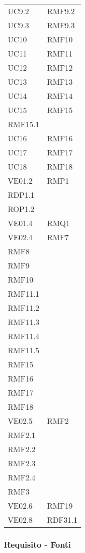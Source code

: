 \begin{longtable}[h!] { >{\centering}m{5cm} >{\centering}m{5cm} }
	 \tabularnewline
	 UC9.2 & RMF9.2
	 \tabularnewline
	 UC9.3 & RMF9.3
	 \tabularnewline
	 UC10 & RMF10
	 \tabularnewline
	 UC11 & RMF11
	 \tabularnewline
	 UC12 & RMF12
	 \tabularnewline
	 UC13 & RMF13
	 \tabularnewline
	 UC14 & RMF14
	 \tabularnewline
	 UC15 & RMF15 \\
	 RMF15.1
	 \tabularnewline
	 UC16 & RMF16
	 \tabularnewline
	 UC17 & RMF17
	 \tabularnewline
	 UC18 & RMF18
	 \tabularnewline
	 VE01.2 & RMP1 \\
	 RDP1.1 \\
	 ROP1.2
	 \tabularnewline
	 VE01.4 & RMQ1
	 \tabularnewline
	 VE02.4 & RMF7\\
	 RMF8 \\
	 RMF9 \\
	 RMF10 \\
	 RMF11.1 \\
	 RMF11.2 \\
	 RMF11.3 \\
	 RMF11.4 \\
	 RMF11.5 \\
	 RMF15 \\
	 RMF16 \\
	 RMF17 \\
	 RMF18
	 \tabularnewline
	 VE02.5 & RMF2 \\
	 RMF2.1 \\
	 RMF2.2 \\
	 RMF2.3 \\
	 RMF2.4 \\
	 RMF3
	 \tabularnewline
	 VE02.6 & RMF19
	 \tabularnewline
	 VE02.8 & RDF31.1
	 \tabularnewline

\end{longtable}

\newpage

\subsubsection{Requisito - Fonti}

